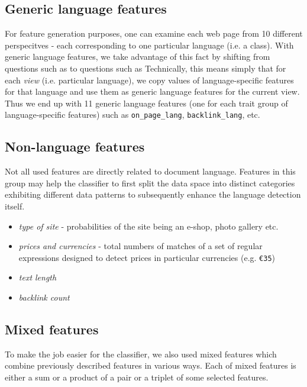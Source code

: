 \documentclass[12pt,a4paper]{article}     %
\begin{document}
  \subsection{Generic language features}
    For feature generation purposes, one can examine each web page from 10 different perspecitves -
    each corresponding to one particular language (i.e. a class). With generic language features, we
    take advantage of this fact by shifting from questions such as  to questions 
    such as  Technically, this means simply
    that for each \textit{view} (i.e. particular language), we copy values of language-specific
    features for that language and use them as generic language features for the current view. Thus
    we end up with 11 generic language features (one for each trait group of language-specific
    features) such as \texttt{on\_page\_lang}, \texttt{backlink\_lang}, etc.

  \subsection{Non-language features}
    Not all used features are directly related to document language. Features in this group may help the
    classifier to first split the data space into distinct categories exhibiting different data patterns 
    to subsequently enhance the language detection itself. 

    \begin{itemize}
      \item \textit{type of site} - probabilities of the site being an e-shop, photo gallery etc.
      \item \textit{prices and currencies} - total numbers of matches of a set of regular
      expressions designed to detect prices in particular currencies (e.g. \texttt{\euro 35}) 
      \item \textit{text length} 
      \item \textit{backlink count}
    \end{itemize}
    
  \subsection{Mixed features}

    To make the job easier for the classifier, we also used mixed features which combine previously
    described features in various ways. Each of mixed features is either a sum or a product of a
    pair or a triplet of some selected features.
\end{document}
